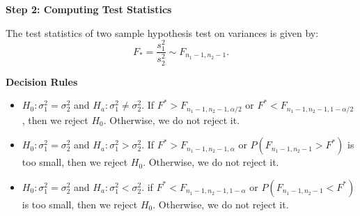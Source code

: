\textbf{Step 2: Computing Test Statistics}

\begin{definition}
The test statistics of two sample hypothesis test on variances is given by: \[ F_* = \frac{s_1^2}{s_2^2} \sim F_{n_1-1,n_2-1}.\]
\end{definition}

\textbf{Decision Rules}

\begin{itemize}
	\item $H_0: \sigma_1^2 = \sigma_2^2$ and $H_a:\sigma_1^2 \neq \sigma_2^2$. If $F^* > F_{n_1-1,n_2-1,\alpha/2}$ or $F^* < F_{n_1-1,n_2-1,1 - \alpha/2}$, then we reject $H_0$. Otherwise, we do not reject it.
	\item $H_0: \sigma_1^2 = \sigma_2^2$ and $H_a: \sigma_1^2 > \sigma_2^2$. If $F^*> F_{n_1-1,n_2-1,\alpha}$ or $P(F_{n_1-1,n_2-1} > F^*)$ is too small, then we reject $H_0$. Otherwise, we do not reject it.
	\item $H_0: \sigma_1^2 = \sigma_2^2$ and $H_a: \sigma_1^2 < \sigma_2^2$. if $F^* < F_{n_1-1,n_2-1,1-\alpha}$ or $P(F_{n_1-1,n_2-1} < F^*)$ is too small, then we reject $H_0$. Otherwise, we do not reject it.
\end{itemize}






